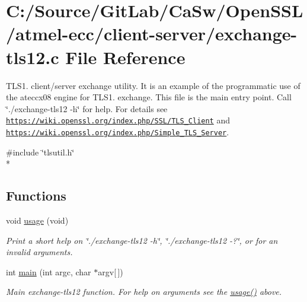 \hypertarget{exchange-tls12_8c}{}\section{C\+:/\+Source/\+Git\+Lab/\+Ca\+Sw/\+Open\+S\+S\+L/atmel-\/ecc/client-\/server/exchange-\/tls12.c File Reference}
\label{exchange-tls12_8c}


T\+L\+S1. client/server exchange utility. It is an example of the programmatic use of the ateccx08 engine for T\+L\+S1. exchange. This file is the main entry point. Call \char`\"{}./exchange-\/tls12 -\/h\char`\"{} for help. For details see \href{https://wiki.openssl.org/index.php/SSL/TLS_Client}{\tt https\+://wiki.\+openssl.\+org/index.\+php/\+S\+S\+L/\+T\+L\+S\+\_\+\+Client} and \href{https://wiki.openssl.org/index.php/Simple_TLS_Server}{\tt https\+://wiki.\+openssl.\+org/index.\+php/\+Simple\+\_\+\+T\+L\+S\+\_\+\+Server}.  


{\ttfamily \#include \char`\"{}tlsutil.\+h\char`\"{}}\\*
\subsection*{Functions}
\begin{DoxyCompactItemize}
\item 
\hypertarget{exchange-tls12_8c_ae8605e2b78cd4a81b6c6b5c30cb7366a}{}void \hyperlink{exchange-tls12_8c_ae8605e2b78cd4a81b6c6b5c30cb7366a}{usage} (void)\label{exchange-tls12_8c_ae8605e2b78cd4a81b6c6b5c30cb7366a}

\begin{DoxyCompactList}\small\item\em Print a short help on \char`\"{}./exchange-\/tls12 -\/h\char`\"{}, \char`\"{}./exchange-\/tls12 -\/?\char`\"{}, or for an invalid arguments. \end{DoxyCompactList}\item 
int \hyperlink{exchange-tls12_8c_a0ddf1224851353fc92bfbff6f499fa97}{main} (int argc, char $\ast$argv\mbox{[}$\,$\mbox{]})
\begin{DoxyCompactList}\small\item\em Main exchange-\/tls12 function. For help on arguments see the \hyperlink{exchange-tls12_8c_ae8605e2b78cd4a81b6c6b5c30cb7366a}{usage()} above. \end{DoxyCompactList}\end{DoxyCompactItemize}


